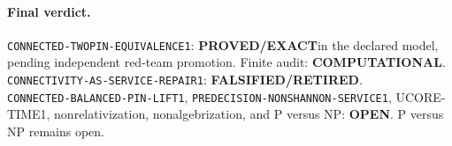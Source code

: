 \documentclass[11pt]{article}
\newcommand{\EXACT}{\textbf{PROVED/EXACT}}
\newcommand{\OPEN}{\textbf{OPEN}}
\newcommand{\RETIRED}{\textbf{FALSIFIED/RETIRED}}
\newcommand{\COMP}{\textbf{COMPUTATIONAL}}
\begin{document}
\paragraph{Final verdict.}
\texttt{CONNECTED-TWOPIN-EQUIVALENCE1}: \EXACT in the declared model,
pending independent red-team promotion.  Finite audit: \COMP.\\
\texttt{CONNECTIVITY-AS-SERVICE-REPAIR1}: \RETIRED.\\
\texttt{CONNECTED-BALANCED-PIN-LIFT1},
\texttt{PREDECISION-NONSHANNON-SERVICE1}, UCORE-TIME1,
nonrelativization, nonalgebrization, and P versus NP: \OPEN.
P versus NP remains open.

\end{document}
